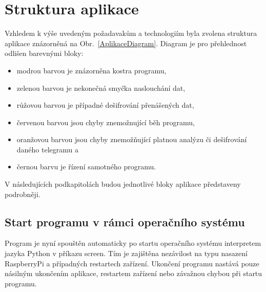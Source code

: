 \section{Struktura aplikace}
Vzhledem k výše uvedeným požadavakům a technologiím byla zvolena struktura aplikace znázorněná na Obr.~\ref{AplikaceDiagram}. Diagram je pro přehlednost odlišen barevnými bloky:
\begin{itemize}
	\item modrou barvou je znázorněna kostra programu,
	\item zelenou barvou je nekonečná smyčka naslouchání dat,
	\item růžovou barvou je případné dešifrování přenášených dat,
	\item červenou barvou jsou chyby znemožnující běh programu,
	\item oranžovou barvou jsou chyby znemožňující platnou analýzu či dešifrování daného telegramu a
	\item černou barvu je řízení samotného programu.
\end{itemize}

V následujících podkapitolách budou jednotlivé bloky aplikace představeny podrobněji.

\subsection{Start programu v rámci operačního systému}
Program je nyní spouštěn automaticky po startu operačního systému interpretem jazyka Python v příkazu screen. Tím je zajištěna nezávilost na typu nasazení RaspberryPi a případných restartech zařízení. Ukončení programu nastává pouze násilným ukončením aplikace, restartem zařízení nebo závažnou chybou při startu programu. 


